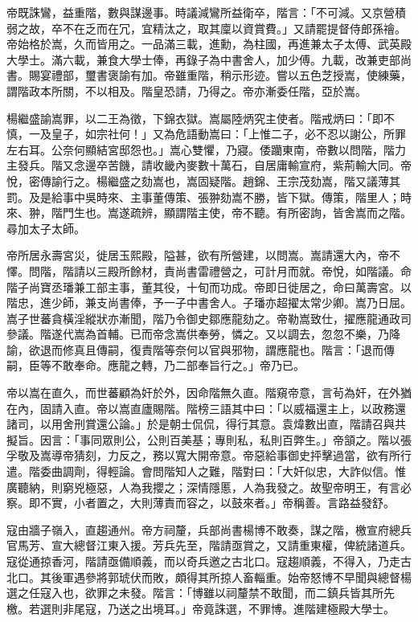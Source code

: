 \begin{pinyinscope}
帝既誅鸞，益重階，數與謀邊事。時議減鸞所益衛卒，階言：「不可減。又京營積弱之故，卒不在乏而在冗，宜精汰之，取其廩以資賞費。」又請罷提督侍郎孫禬。帝始格於嵩，久而皆用之。一品滿三載，進勳，為柱國，再進兼太子太傅、武英殿大學士。滿六載，兼食大學士俸，再錄子為中書舍人，加少傅。九載，改兼吏部尚書。賜宴禮部，璽書褒諭有加。帝雖重階，稍示形迹。嘗以五色芝授嵩，使練藥，謂階政本所關，不以相及。階皇恐請，乃得之。帝亦漸委任階，亞於嵩。

楊繼盛諭嵩罪，以二王為徵，下錦衣獄。嵩屬陸炳究主使者。階戒炳曰：「即不慎，一及皇子，如宗社何！」又為危語動嵩曰：「上惟二子，必不忍以謝公，所罪左右耳。公奈何顯結宮邸怨也。」嵩心雙懼，乃寢。倭躪東南，帝數以問階，階力主發兵。階又念邊卒苦饑，請收畿內麥數十萬石，自居庸輸宣府，紫荊輸大同。帝悅，密傳諭行之。楊繼盛之劾嵩也，嵩固疑階。趙錦、王宗茂劾嵩，階又議薄其罰。及是給事中吳時來、主事董傳策、張翀劾嵩不勝，皆下獄。傳策，階里人；時來、翀，階門生也。嵩遂疏辨，顯謂階主使，帝不聽。有所密詢，皆舍嵩而之階。尋加太子太師。

帝所居永壽宮災，徙居玉熙殿，隘甚，欲有所營建，以問嵩。嵩請還大內，帝不懌。問階，階請以三殿所餘材，責尚書雷禮營之，可計月而就。帝悅，如階議。命階子尚寶丞璠兼工部主事，董其役，十旬而功成。帝即日徙居之，命曰萬壽宮。以階忠，進少師，兼支尚書俸，予一子中書舍人。子璠亦超擢太常少卿。嵩乃日屈。嵩子世蕃貪橫淫縱狀亦漸聞，階乃令御史鄒應龍劾之。帝勒嵩致仕，擢應龍通政司參議。階遂代嵩為首輔。已而帝念嵩供奉勞，憐之。又以調去，忽忽不樂，乃降諭，欲退而修真且傳嗣，復責階等奈何以官與邪物，謂應龍也。階言：「退而傳嗣，臣等不敢奉命。應龍之轉，乃二部奉旨行之。」帝乃已。

帝以嵩在直久，而世蕃顧為奸於外，因命階無久直。階窺帝意，言茍為奸，在外猶在內，固請入直。帝以嵩直廬賜階。階榜三語其中曰：「以威福還主上，以政務還諸司，以用舍刑賞還公論。」於是朝士侃侃，得行其意。袁煒數出直，階請召與共擬旨。因言：「事同眾則公，公則百美基；專則私，私則百弊生。」帝頷之。階以張孚敬及嵩導帝猜刻，力反之，務以寬大開帝意。帝惡給事御史抨擊過當，欲有所行遣。階委曲調劑，得輕論。會問階知人之難，階對曰：「大奸似忠，大詐似信。惟廣聽納，則窮兇極惡，人為我攖之；深情隱慝，人為我發之。故聖帝明王，有言必察。即不實，小者置之，大則薄責而容之，以鼓來者。」帝稱善。言路益發舒。

寇由牆子嶺入，直趨通州。帝方祠釐，兵部尚書楊博不敢奏，謀之階，檄宣府總兵官馬芳、宣大總督江東入援。芳兵先至，階請亟賞之，又請重東權，俾統諸道兵。寇從通掠香河，階請亟備順義，而以奇兵邀之古北口。寇趨順義，不得入，乃走古北口。其後軍遇參將郭琥伏而敗，頗得其所掠人畜輜重。始帝怒博不早聞與總督楊選之任寇入也，欲罪之未發。階言：「博雖以祠釐禁不敢聞，而二鎮兵皆其所先檄。若選則非尾寇，乃送之出境耳。」帝竟誅選，不罪博。進階建極殿大學士。


\end{pinyinscope}
